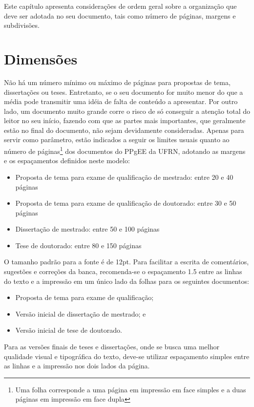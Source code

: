 
\label{Cap:estilo}

Este capítulo apresenta considerações de ordem geral sobre a
organização que deve ser adotada no seu documento, tais como número de
páginas, margens e subdivisões.

\section{Dimensões}
\label{Sec:estilo}

Não há um número mínimo ou máximo de páginas para propostas de tema,
dissertações ou teses. Entretanto, se o seu documento for muito menor
do que a média pode transmitir uma idéia de falta de conteúdo a
apresentar. Por outro lado, um documento muito grande corre o risco de
só conseguir a atenção total do leitor no seu início, fazendo com que
as partes mais importantes, que geralmente estão no final do
documento, não sejam devidamente consideradas. Apenas para servir como
parâmetro, estão indicados a seguir os limites usuais quanto ao número
de páginas\footnote{Uma folha corresponde a uma página em impressão em
face simples e a duas páginas em impressão em face dupla} dos
documentos do PPgEE da UFRN, adotando as margens e os espaçamentos
definidos neste modelo:
\begin{itemize}
\item Proposta de tema para exame de qualificação de mestrado:
entre 20 e 40 páginas
\item Proposta de tema para exame de qualificação de doutorado:
entre 30 e 50 páginas
\item Dissertação de mestrado:
entre 50 e 100 páginas
\item Tese de doutorado:
entre 80 e 150 páginas
\end{itemize}

O tamanho padrão para a fonte é de 12pt.  Para facilitar a escrita de
comentários, sugestões e correções da banca, recomenda-se o espaçamento
1.5 entre as linhas do texto e a impressão em um único lado da folhas
para os seguintes documentos:
\begin{itemize}
\item Proposta de tema para exame de qualificação;
\item Versão inicial de dissertação de mestrado; e
\item Versão inicial de tese de doutorado.
\end{itemize}
Para as versões finais de teses e dissertações, onde se busca uma
melhor qualidade visual e tipográfica do texto, deve-se utilizar
espaçamento simples entre as linhas e a impressão nos dois lados da
página.

